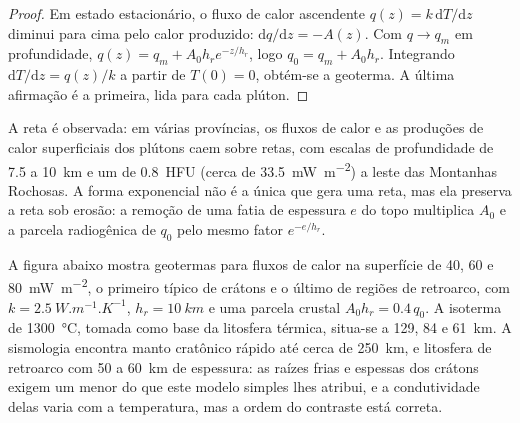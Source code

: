 \begin{proof}
Em estado estacionário, o fluxo de calor ascendente $q(z) = k\,\mathrm dT/\mathrm dz$ diminui
para cima pelo calor produzido: $\mathrm dq/\mathrm dz = -A(z)$. Com $q \to q_m$
em profundidade, $q(z) = q_m + A_0h_re^{-z/h_r}$, logo $q_0 = q_m + A_0h_r$. Integrando
$\mathrm dT/\mathrm dz = q(z)/k$ a partir de $T(0) = 0$, obtém-se a geoterma. A última
afirmação é a primeira, lida para cada plúton.
\end{proof}

A reta é observada: em várias províncias, os fluxos de calor e as produções de calor superficiais
dos plútons caem sobre retas, com escalas de profundidade de 7.5 a
\qty{10}{km} e um  de \qty{0.8}{HFU} (cerca de
\qty{33.5}{mW.m^{-2}}) a leste das Montanhas Rochosas. A forma exponencial não é a única que gera uma reta,
mas ela preserva a reta sob erosão: a remoção de uma fatia de espessura $e$ do topo multiplica
$A_0$ e a parcela radiogênica de $q_0$ pelo mesmo fator $e^{-e/h_r}$.

A figura abaixo mostra geotermas para fluxos de calor na superfície de 40, 60 e
\qty{80}{mW.m^{-2}}, o primeiro típico de crátons e o último de regiões de retroarco,
com $k = \qty{2.5}{W.m^{-1}.K^{-1}}$, $h_r = \qty{10}{km}$ e uma
parcela crustal $A_0h_r = 0.4\,q_0$. A isoterma de \qty{1300}{\celsius}, tomada como
base da litosfera térmica, situa-se a 129, 84 e \qty{61}{km}.
A sismologia encontra manto cratônico rápido até cerca de \qty{250}{km}, e litosfera de retroarco
com 50 a \qty{60}{km} de espessura: as raízes frias e espessas dos crátons exigem um
 menor do que este modelo simples lhes atribui, e a
condutividade delas varia com a temperatura, mas a ordem do contraste está correta.

